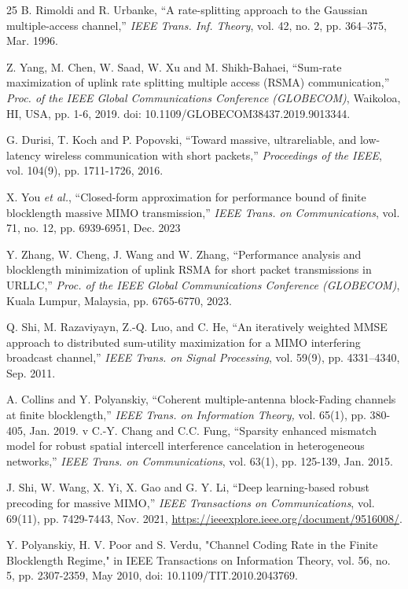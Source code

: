 \documentclass[a4paper, 12pt, onecolumn, journal, twoside, draftclsnofoot]{IEEEtran}
\begin{document}
\begin{thebibliography}{25} 
B. Rimoldi and R. Urbanke, ``A rate-splitting approach to the Gaussian multiple-access channel,'' \emph{IEEE Trans. Inf. Theory},  vol. 42, no. 2, pp. 364–375, Mar. 1996.

Z. Yang, M. Chen, W. Saad, W. Xu and M. Shikh-Bahaei, ``Sum-rate maximization of uplink rate splitting multiple access (RSMA) communication,'' \emph{Proc. of the IEEE Global Communications Conference (GLOBECOM)}, Waikoloa, HI, USA, pp. 1-6, 2019.  doi: 10.1109/GLOBECOM38437.2019.9013344.

G. Durisi, T. Koch and P. Popovski, ``Toward massive, ultrareliable, and low-latency wireless communication with short packets,'' \emph{Proceedings of the IEEE}, vol. 104(9), pp. 1711-1726, 2016.

X. You \emph{et al.}, ``Closed-form approximation for performance bound of finite blocklength massive MIMO transmission,'' \emph{IEEE Trans. on Communications}, vol. 71, no. 12, pp. 6939-6951, Dec. 2023

Y. Zhang, W. Cheng, J. Wang and W. Zhang, ``Performance analysis and blocklength minimization of uplink RSMA for short packet transmissions in URLLC,'' \emph{Proc. of the IEEE Global Communications Conference (GLOBECOM)}, Kuala Lumpur, Malaysia, pp. 6765-6770, 2023.

Q. Shi, M. Razaviyayn, Z.-Q. Luo, and C. He, ``An iteratively weighted MMSE approach to distributed sum-utility maximization for a MIMO interfering broadcast channel,'' \emph{IEEE Trans. on Signal Processing}, vol. 59(9), pp. 4331–4340, Sep. 2011.

A. Collins and Y. Polyanskiy, ``Coherent multiple-antenna block-Fading channels at finite blocklength,'' \emph{IEEE Trans. on Information Theory,} vol. 65(1), pp. 380-405, Jan. 2019.
v
C.-Y. Chang and C.C. Fung, ``Sparsity enhanced mismatch model for robust spatial intercell interference cancelation in heterogeneous networks,'' \emph{IEEE Trans. on Communications}, vol. 63(1), pp. 125-139, Jan. 2015.

J. Shi, W. Wang, X. Yi, X. Gao and G. Y. Li, ``Deep learning-based robust precoding for massive MIMO,'' \emph{IEEE Transactions on Communications}, vol. 69(11), pp. 7429-7443, Nov. 2021, \href{https://ieeexplore.ieee.org/document/9516008/}{https://ieeexplore.ieee.org/document/9516008/}.

Y. Polyanskiy, H. V. Poor and S. Verdu, "Channel Coding Rate in the Finite Blocklength Regime," in IEEE Transactions on Information Theory, vol. 56, no. 5, pp. 2307-2359, May 2010, doi: 10.1109/TIT.2010.2043769.



\end{thebibliography}
\end{document}
